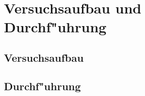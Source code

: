 \section{Versuchsaufbau und Durchf"uhrung} %
\label{sec:durchf_uhrung}

\subsection{Versuchsaufbau} %
\label{sub:aufbau}


\subsection{Durchf"uhrung} %
\label{sub:durchf_uhrung}
